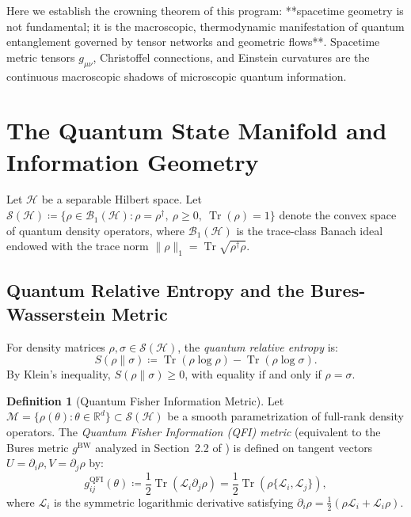 \documentclass[11pt,a4paper,reqno]{amsart}
\theoremstyle{definition}
\newtheorem{definition}[theorem]{Definition}
\numberwithin{equation}{section}
\providecommand{\R}{\mathbb{R}}
\newcommand{\Tr}{\operatorname{Tr}}
\begin{document}
Here we establish the crowning theorem of this program: **spacetime geometry is not fundamental; it is the macroscopic, thermodynamic manifestation of quantum entanglement governed by tensor networks and geometric flows**. Spacetime metric tensors $g_{\mu\nu}$, Christoffel connections, and Einstein curvatures are the continuous macroscopic shadows of microscopic quantum information.

\section{The Quantum State Manifold and Information Geometry}
\label{sec:quantum_info_geom}

Let $\mathscr{H}$ be a separable Hilbert space. Let $\mathcal{S}(\mathscr{H}) \coloneqq \{\rho \in \mathcal{B}_1(\mathscr{H}) \colon \rho = \rho^\dagger, \ \rho \ge 0, \ \Tr(\rho) = 1\}$ denote the convex space of quantum density operators, where $\mathcal{B}_1(\mathscr{H})$ is the trace-class Banach ideal endowed with the trace norm $\|\rho\|_1 = \Tr\sqrt{\rho^\dagger \rho}$.

\subsection{Quantum Relative Entropy and the Bures-Wasserstein Metric}
For density matrices $\rho, \sigma \in \mathcal{S}(\mathscr{H})$, the \emph{quantum relative entropy} is:
\begin{equation}
    \label{eq:relative_entropy}
    S(\rho \| \sigma) \coloneqq \Tr(\rho \log \rho) - \Tr(\rho \log \sigma).
\end{equation}
By Klein's inequality, $S(\rho \| \sigma) \ge 0$, with equality if and only if $\rho = \sigma$.

\begin{definition}[Quantum Fisher Information Metric]
Let $\mathcal{M} = \{\rho(\theta) \colon \theta \in \R^d\} \subset \mathcal{S}(\mathscr{H})$ be a smooth parametrization of full-rank density operators. The \emph{Quantum Fisher Information (QFI) metric} (equivalent to the Bures metric $g^{\mathrm{BW}}$ analyzed in Section~2.2 of \cite{silvafilho2026flows}) is defined on tangent vectors $U = \partial_i \rho, V = \partial_j \rho$ by:
\begin{equation}
    \label{eq:qfi_metric}
    g_{ij}^{\mathrm{QFI}}(\theta) \coloneqq \frac{1}{2} \Tr\left( \mathcal{L}_i \partial_j \rho \right) = \frac{1}{2} \Tr\left( \rho \{ \mathcal{L}_i, \mathcal{L}_j \} \right),
\end{equation}
where $\mathcal{L}_i$ is the symmetric logarithmic derivative satisfying $\partial_i \rho = \frac{1}{2}(\rho \mathcal{L}_i + \mathcal{L}_i \rho)$.
\end{definition}
\end{document}
